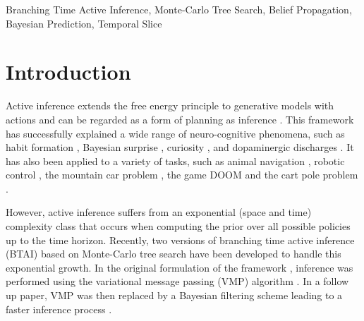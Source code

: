 \documentclass[twoside,11pt]{article}
\begin{document}
\begin{keywords}
Branching Time Active Inference, Monte-Carlo Tree Search, Belief Propagation, Bayesian Prediction, Temporal Slice
\end{keywords}

\section{Introduction}

Active inference extends the free energy principle to generative models with actions \citep{FRISTON2016862,AI_TUTO,AI_VMP} and can be regarded as a form of planning as inference \citep{PAI}. This framework has successfully explained a wide range of neuro-cognitive phenomena, such as habit formation \citep{FRISTON2016862}, Bayesian surprise \citep{bayes_surprise}, curiosity \citep{curiosity}, and dopaminergic discharges \citep{dopamine}. It has also been applied to a variety of tasks, such as animal navigation \citep{DeepAIwithMCMC}, robotic control \citep{pezzato2020active,sancaktar2020endtoend}, the mountain car problem \citep{catal2020learning}, the  game DOOM \citep{CULLEN2018809} and the cart pole problem \citep{cart_pole}.

However, active inference suffers from an exponential (space and time) complexity class that occurs when computing the prior over all possible policies up to the time horizon. Recently, two versions of branching time active inference (BTAI) based on Monte-Carlo tree search \citep{MCTS} have been developed to handle this exponential growth. In the original formulation of the framework \citep{AITS_THEORY, AITS_PRACTICE}, inference was performed using the variational message passing (VMP) algorithm \citep{VMP_TUTO, AI_VMP}. In a follow up paper, VMP was then replaced by a Bayesian filtering \citep{BAYESIAN_FILTERING} scheme leading to a faster inference process \citep{BTAI_BF}.
\end{document}
